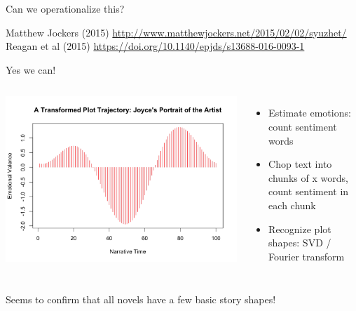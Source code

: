 \documentclass[aspectratio=169,usenames,dvipsnames]{beamer}
\begin{document}
\begin{frame}{Can we operationalize this?}
    \begin{reference}
        Matthew Jockers (2015) \url{http://www.matthewjockers.net/2015/02/02/syuzhet/} \\
        Reagan et al (2015) \url{https://doi.org/10.1140/epjds/s13688-016-0093-1}
    \end{reference}
    Yes we can!
    
    \begin{columns}
    \includegraphics[width=1\textwidth]{fig/joycearc}

    \begin{itemize}
        \item Estimate emotions: count sentiment words
        \item Chop text into chunks of x words, count sentiment in each chunk
        \item Recognize plot shapes: SVD / Fourier transform
    \end{itemize}
    \end{columns}
    Seems to confirm that all novels have a few basic story shapes!
\end{frame}
\end{document}
